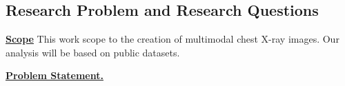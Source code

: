 \subsection{Research Problem and Research Questions}
\underline{\textbf{Scope}} This work scope to the creation of multimodal chest X-ray images. Our analysis will be based on public datasets. %
\noindent

\underline{\textbf{Problem Statement.}}


